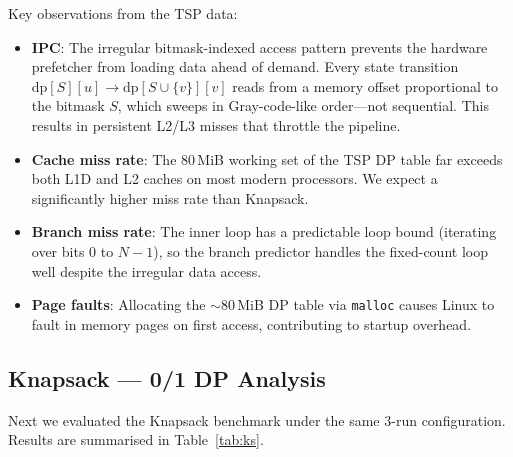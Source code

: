 \documentclass[11pt,a4paper]{article}
\begin{document}
Key observations from the TSP data:

\begin{itemize}[leftmargin=*]
    \item \textbf{IPC}: The irregular bitmask-indexed access pattern prevents
          the hardware prefetcher from loading data ahead of demand.
          Every state transition
          $\mathrm{dp}[S][u] \to \mathrm{dp}[S \cup \{v\}][v]$ reads from a
          memory offset proportional to the bitmask $S$, which sweeps in
          Gray-code-like order—not sequential.  This results in persistent
          L2/L3 misses that throttle the pipeline.

    \item \textbf{Cache miss rate}: The 80\,MiB working set of the TSP DP
          table far exceeds both L1D and L2 caches on most modern processors.
          We expect a significantly higher miss rate than Knapsack.

    \item \textbf{Branch miss rate}: The inner loop has a predictable loop
          bound (iterating over bits 0 to $N-1$), so the branch predictor
          handles the fixed-count loop well despite the irregular data access.

    \item \textbf{Page faults}: Allocating the ${\sim}80$\,MiB DP table via
          \texttt{malloc} causes Linux to fault in memory pages on first
          access, contributing to startup overhead.
\end{itemize}

\subsection{Knapsack — 0/1 DP Analysis}

Next we evaluated the Knapsack benchmark under the same 3-run configuration.
Results are summarised in Table~\ref{tab:ks}.
\end{document}
